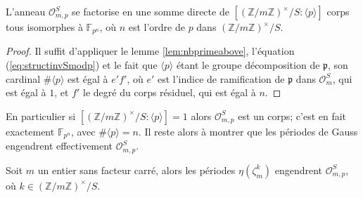 \documentclass[a4paper]{article} %
\numberwithin{section}{part}
\numberwithin{equation}{section}
\newcommand\zmodninv[1]{(\mathbb{Z}/#1\mathbb{Z})^{\times}}
\newcommand\GF[1]{\mathbb{F}_{#1}}
\newcommand\EO{\mathcal{O}}
\newcommand\groupgen[1]{\langle{#1}\rangle}
\begin{document}
\begin{cor}
L'anneau $\EO_{m,p}^S$ se factorise en une somme directe de
$[\zmodninv{m}/S:\groupgen{p}]$ corps tous isomorphes à $\GF{p^n}$, où $n$ est 
l'ordre de $p$ dans $\zmodninv{m}/S$.
\end{cor}
\begin{proof}
Il suffit d'appliquer le lemme \ref{lem:nbprimeabove}, l'équation
(\ref{eq:structinvSmodp}) et le fait que $\groupgen{p}$ étant le groupe
décomposition de $\mathfrak{p}$, son cardinal $\#\groupgen{p}$ est égal à 
$e'f'$, où $e'$ est l'indice de ramification de $\mathfrak{p}$ dans $\EO_m^S$, 
qui est égal à $1$, et $f'$ le degré du corps résiduel, qui est égal à $n$.
\end{proof}
En particulier si $[\zmodninv{m}/S:\groupgen{p}] = 1$ alors $\EO_{m,p}^S$ est
un corps; c'est en fait exactement $\GF{p^n}$, avec $\#\groupgen{p} = n$. Il 
reste alors à montrer que les périodes de Gauss engendrent effectivement 
$\EO_{m,p}^S$.
\begin{lem}
Soit $m$ un entier sans facteur carré, alors les périodes $\eta(\zeta_m^k)$
engendrent $\EO_{m,p}^S$, où $k\in\zmodninv{m}/S$.
\end{lem}
\end{document}
